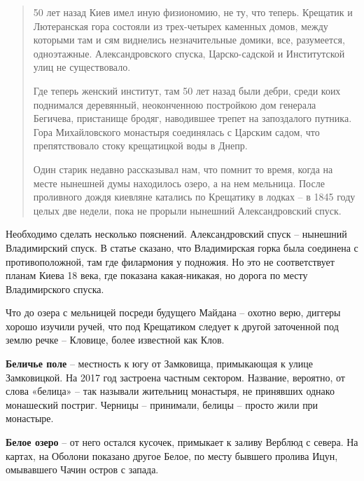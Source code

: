 \begin{quotation}
50 лет назад Киев имел иную физиономию, не ту, что теперь. Крещатик и Лютеранская гора состояли из трех-четырех каменных домов, между которыми там и сям виднелись не\-значительные домики, все, разумеется, одноэтажные. Александровского спуска, Царско-садской и Институтской улиц не существовало.

Где теперь женский институт, там 50 лет назад были дебри, среди коих поднимался деревянный, неоконченною постройкою дом генерала Бегичева, пристанище бродяг, наводившее трепет на запоздалого путника. Гора Михайловского монастыря соединялась с Царским садом, что препятствовало стоку крещатицкой воды в Днепр.

Один старик недавно рассказывал нам, что помнит то время, когда на месте нынешней думы находилось озеро, а на нем мельница. После проливного дождя киевляне катались по Крещатику в лодках – в 1845 году целых две недели, пока не прорыли нынешний Александровский спуск.
\end{quotation}

Необходимо сделать несколько пояснений. Александровский спуск – нынешний Владимирский спуск. В статье сказано, что Владимирская горка была соединена с противоположной, там где филармония у подножия. Но это не соответствует планам Киева 18 века, где показана какая-никакая, но дорога по месту Владимирского спуска.

Что до озера с мельницей посреди будущего Майдана – охотно верю, диггеры хорошо изучили ручей, что под Крещатиком следует к другой заточенной под землю речке – Кловице, более известной как Клов.\\

\medskip


\textbf{Беличье поле} – местность к югу от Замковища, примыкающая к улице Замковицкой. На 2017 год застроена частным сектором. Название, вероятно, от слова «белица» – так называли жительниц монастыря, не принявших однако монашеский постриг. Черницы – принимали, белицы – просто жили при монастыре.\\

\medskip






\textbf{Белое озеро} – от него остался кусочек, примыкает к заливу Верблюд с севера. На картах, на Оболони показано другое Белое, по месту бывшего пролива Ицун, омывавшего Чачин остров с запада.\\


